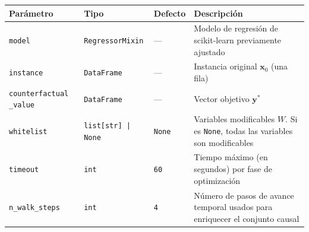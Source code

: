 \documentclass[12pt]{report} %
\begin{document}
\begin{table}[H]
    {\begin{tabular}{|p{4cm}|p{3.2cm}|p{1.5cm}|p{4.5cm}|}
            \hline
            \textbf{Parámetro}      & \textbf{Tipo}             & \textbf{Defecto} & \textbf{Descripción}                                                                                                                                                                               \\
            \hline
            \texttt{model}          & \texttt{RegressorMixin}   & ---              & Modelo de regresión de scikit-learn previamente ajustado                                                                                                                                           \\
            \hline
            \texttt{instance}       & \texttt{DataFrame}        & ---              & Instancia original $\mathbf{x}_0$ (una fila)                                                                                                                                                       \\
            \hline
            \texttt{counterfactual
                \_value}  & \texttt{DataFrame}        & ---              & Vector objetivo $\mathbf{y}^{*}$                                                                                                                                                                             \\
            \hline
            \texttt{whitelist}      & \texttt{list[str] | None} & \texttt{None}    & Variables modificables $W$. Si es \texttt{None}, todas las variables son modificables                                                                                                              \\
            \hline
            \texttt{timeout}        & \texttt{int}              & \texttt{60}      & Tiempo máximo (en segundos) por fase de optimización                                                                                                                                               \\
            \hline
            \texttt{n\_walk\_steps} & \texttt{int}              & \texttt{4}       & Número de pasos de avance temporal usados para enriquecer el conjunto causal                                                                                                                       \\

\end{tabular}}
\end{table}
\end{document}

